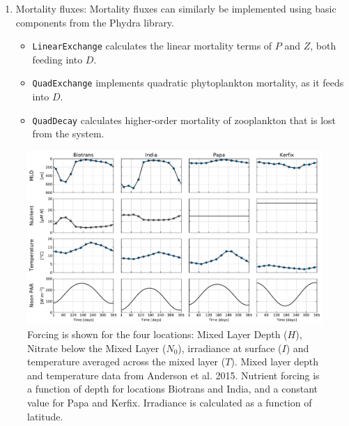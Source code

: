 \documentclass[journal abbreviation, manuscript]{copernicus}
\begin{document}
\begin{enumerate}
    \item Mortality fluxes: Mortality fluxes can similarly be implemented using basic components from the Phydra library.
    \begin{itemize}
        \item \texttt{LinearExchange} calculates the linear mortality terms of $P$ and $Z$, both feeding into $D$. 
        \item \texttt{QuadExchange} implements quadratic phytoplankton mortality, as it feeds into $D$. 
        \item \texttt{QuadDecay} calculates higher-order mortality of zooplankton that is lost from the system.
    \end{itemize}
\end{enumerate}

\begin{figure}[t]
\includegraphics[width=15cm]{Figures/firstdraft_plots/02_EMPOWER_forcing.pdf}
\caption{Forcing is shown for the four locations: Mixed Layer Depth ($H$), Nitrate below the Mixed Layer ($N_0$), irradiance at surface ($I$) and temperature averaged across the mixed layer ($T$). Mixed layer depth and temperature data from Anderson et al. 2015. Nutrient forcing is a function of depth for locations Biotrans and India, and a constant value for Papa and Kerfix. Irradiance is calculated as a function of latitude.}
\label{Figure:EMPOWERforcing}
\end{figure}
\end{document}
